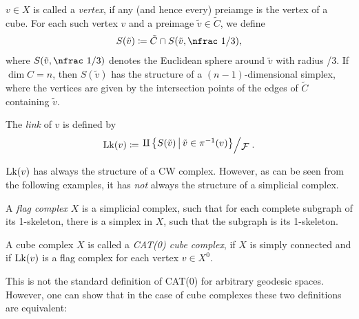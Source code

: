 \begin{defin}[Link]
  \(v \in X\) is called a \emph{vertex}, if any (and hence every) preiamge is the vertex of a cube. For each such vertex \(v\) and a preimage \(\tilde v \in \tilde C\), we define
  \begin{align*}
    S(\tilde v) \coloneqq \tilde C \cap S(\tilde v, \text{\nfrac 1/3}),
  \end{align*}
  where \(S(\tilde v, \text{\nfrac 1/3})\) denotes the Euclidean sphere around \(\tilde v\) with radius {/3}. If \(\dim C = n\), then \(S(\tilde v)\) has the structure of a \((n-1)\)-dimensional simplex, where the vertices are given by the intersection points of the edges of \(\tilde C\) containing \(\tilde v\).

  The \emph{link} of \(v\) is defined by
  \begin{align*}
    \lk(v) \coloneqq \quot{\amalg \left\{S(\tilde v) \relmid \tilde v \in \pi^{-1}(v)\right\}}{\mathcal{F}}.
  \end{align*}
\end{defin}

\begin{rem}
  \(\operatorname{Lk}(v)\) has always the structure of a CW complex. However, as can be seen from the following examples, it has \emph{not} always the structure of a simplicial complex.
\end{rem}

\begin{bsp}
\end{bsp}

\begin{defin}
  A \emph{flag complex} \(X\) is a simplicial complex, such that for each complete subgraph of its 1-skeleton, there is a simplex in \(X\), such that the subgraph is its 1-skeleton.
\end{defin}

\begin{defin}
  A cube complex \(X\) is called a \emph{CAT(0) cube complex}, if \(X\) is simply connected and if \(\operatorname{Lk}(v)\) is a flag complex for each vertex \(v \in X^0\). 
\end{defin}

\begin{rem}
  This is not the standard definition of CAT(0) for arbitrary geodesic spaces. However, one can show that in the case of cube complexes these two definitions are equivalent:
\end{rem}

